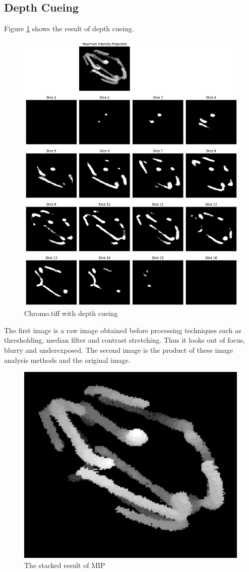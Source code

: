 \documentclass{article}
\begin{document}
\subsection*{Depth Cueing}
Figure \ref{fig:depth-cuing-results} shows the result of depth cueing. 
\begin{figure}[h!]
    \centering
    \includegraphics[width=1\linewidth]{Report/Images/mip.png}
    \caption{Chromo.tiff with depth cueing}
    \label{fig:depth-cuing-results}
\end{figure}

The first image is a raw image obtained before processing techniques such as thresholding, median filter and contrast stretching. Thus it looks out of focus, blurry and underexposed. The second image is the product of these image analysis methods and the original image. 

\begin{figure}[h!]
    \centering
    \includegraphics[width=0.5\linewidth]{Report/Images/max_intensity.png}
    \caption{The stacked result of MIP}
    \label{fig:mip}
\end{figure}
\end{document}
